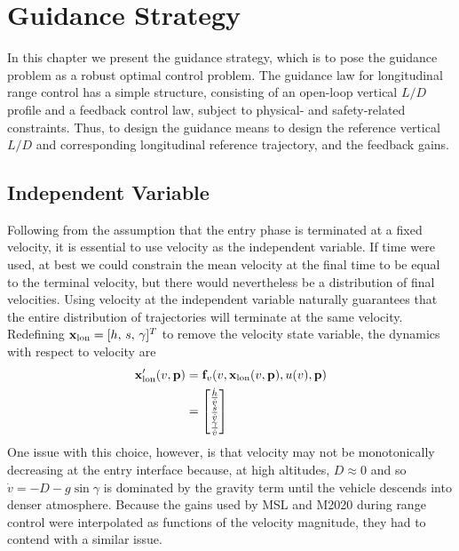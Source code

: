 \chapter{Guidance Strategy}
In this chapter we present the guidance strategy, which is to pose the guidance problem as a robust optimal control problem. 
The guidance law for longitudinal range control has a simple structure, consisting of an open-loop vertical $L/D$ profile and a feedback control law, subject to physical- and safety-related constraints. Thus, to design the guidance means to design the reference vertical $L/D$ and corresponding longitudinal reference trajectory, and the feedback gains. 
%

\section{Independent Variable}
Following from the assumption that the entry phase is terminated at a fixed velocity, it is essential to use velocity as the independent variable. If time were used, at best we could constrain the mean velocity at the final time to be equal to the terminal velocity, but there would nevertheless be a distribution of final velocities. Using velocity at the independent variable naturally guarantees that the entire distribution of trajectories will terminate at the same velocity.
Redefining $\mathbf{x}_{\mathrm{lon}} = [h,\,s,\,\gamma]^T$ to remove the velocity state variable, the dynamics with respect to velocity are 
\begin{align}
	\mathbf{x}_{\mathrm{lon}}'(v,\mathbf{p}) &= \mathbf{f}_v(v,\mathbf{x}_{\mathrm{lon}}(v,\mathbf{p}),u(v),\mathbf{p}) \label{Eq:DynamicsWRTVel}\\
	&= \begin{bmatrix}
		\frac{\dot{h}}{\dot{v}} \\
		\frac{\dot{s}}{\dot{v}} \\
		\frac{\dot{\gamma}}{\dot{v}} 
	\end{bmatrix}
\end{align}
One issue with this choice, however, is that velocity may not be monotonically decreasing at the entry interface because, at high altitudes, $D\approx0$ and so $\dot{v}=-D-g\sin\gamma$ is dominated by the gravity term until the vehicle descends into denser atmosphere. Because the gains used by MSL and M2020 during range control were interpolated as functions of the velocity magnitude, they had to contend with a similar issue.

